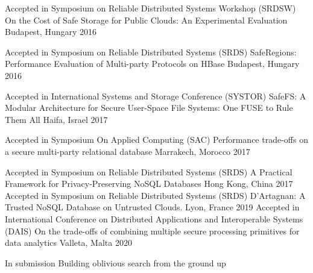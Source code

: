 

\begin{cventries}


  \cventry
    {Accepted in Symposium on Reliable Distributed Systems Workshop (SRDSW)} %
    {\footnotesize{On the Cost of Safe Storage for Public Clouds: An Experimental Evaluation}} %
    {Budapest, Hungary} %
    {2016} %
    {}
\vspace{-2.0mm}

  \cventry
    {Accepted in Symposium on Reliable Distributed Systems (SRDS)}
    {\footnotesize{SafeRegions: Performance Evaluation of Multi-party Protocols on HBase}}
    {Budapest, Hungary}
    {2016}
    {}
\vspace{-2.0mm}

  \cventry
    {Accepted in International Systems and Storage Conference (SYSTOR)} %
    {\footnotesize{SafeFS: A Modular Architecture for Secure User-Space File Systems: One FUSE to Rule Them All}} %
    {Haifa, Israel} %
    {2017} %
    {}
\vspace{-2.0mm}

\cventry
  {Accepted in Symposium On Applied Computing (SAC)} %
  {\footnotesize{Performance trade-offs on a secure multi-party relational database}} %
  {Marrakech, Morocco} %
  {2017} %
  {}
\vspace{-2.0mm}

\cventry
  {Accepted in Symposium on Reliable Distributed Systems (SRDS)} %
  {\footnotesize{A Practical Framework for Privacy-Preserving NoSQL Databases}} %
  {Hong Kong, China} %
  {2017} %
  {}
\vspace{-2.0mm}
\cventry
  {Accepted in Symposium on Reliable Distributed Systems (SRDS)} %
  {\footnotesize{D'Artagnan: A Trusted NoSQL Database on Untrusted Clouds.}} %
  {Lyon, France} %
  {2019} %
  {}
\vspace{-2.0mm}
\cventry
  {Accepted in International Conference on Distributed Applications and Interoperable Systems (DAIS)} %
  {\footnotesize{On the trade-offs of combining multiple secure processing primitives for data analytics}} %
  {Valleta, Malta} %
  {2020} %
  {}

\vspace{-2.0mm}
\cventry
  {In submission} %
  {\footnotesize{Building oblivious search from the ground up}} %
  {} %
  {} %
  {}



\end{cventries}
